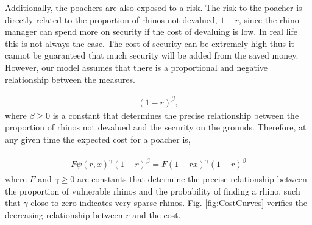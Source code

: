 \documentclass[10pt]{article}
\begin{document}
Additionally, the poachers are also exposed to a risk. The risk to the poacher is
directly related to the proportion of rhinos not devalued, \(1 - r\), since
the rhino manager can spend more on security if the cost of devaluing is low.
In real life this is not always the case. The cost of security can be extremely
high thus it cannot be guaranteed that much security will be added from the
saved money. However, our model assumes that there is a proportional and negative
relationship between the measures.

\begin{eqnarray}
    \label{eqn:risk}
    (1 - r)^{\beta},
\end{eqnarray}
where \(\beta \geq 0\) is a constant that determines the precise relationship between
the proportion of rhinos not devalued and the security on the grounds. Therefore,
at any given time the expected cost for a poacher is, 

\begin{eqnarray}
    \label{eqn:individual_cost}
    \begin{array}{l}
    F \psi(r, x)^{\gamma} (1 - r)^{\beta} = F (1 - rx) ^{\gamma} (1 - r) ^{\beta}
    \end{array}
\end{eqnarray}
where \(F\) and \(\gamma \geq 0\) are constants that determine the precise relationship
between the proportion of vulnerable rhinos and the probability of finding a rhino,
such that \(\gamma\) close to zero indicates very sparse rhinos. Fig.
\ref{fig:CostCurves} verifies the decreasing relationship between \(r\) and the
cost.
\end{document}

